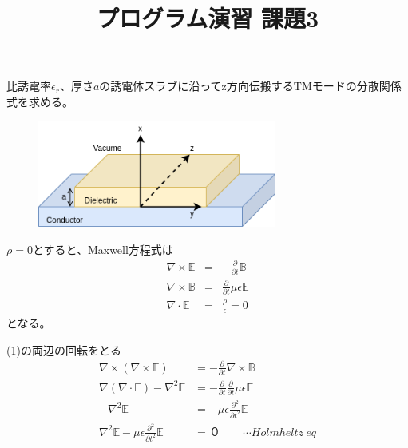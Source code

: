\documentclass[a4paper,10pt]{bxjsarticle}
\title{プログラム演習 課題3}
\date{ }
\begin{document}
\maketitle


比誘電率$\epsilon_r$、厚さ$a$の誘電体スラブに沿ってz方向伝搬するTMモードの分散関係式を求める。

\begin{figure}[h]
    \centering
    \includegraphics[width=0.7\textwidth]{fig.png}
    \caption{}
    \label{fig:1}
\end{figure}

$\rho = 0$とすると、Maxwell方程式は
\begin{eqnarray}
    \nabla \times \mathbb{E} &=& - \frac{\partial}{\partial t} \mathbb{B} \\
    \nabla \times \mathbb{B} &=&  \frac{\partial}{\partial t} \mu \epsilon \mathbb{E} \\
    \nabla \cdot \mathbb{E} &=& \frac{\rho}{\epsilon} = 0
\end{eqnarray}
となる。

(1)の両辺の回転をとる
\begin{align*}
    \nabla \times \left(\nabla \times \mathbb{E}\right)
        &= - \frac{\partial}{\partial t} \nabla \times \mathbb{B} \\
    \nabla \left(\nabla \cdot \mathbb{E}\right) - \nabla^2 \mathbb{E}
        &= - \frac{\partial}{\partial t} \frac{\partial}{\partial t} \mu \epsilon \mathbb{E} \\
    - \nabla^2 \mathbb{E}
        &= - \mu \epsilon \frac{\partial^2}{\partial t^2} \mathbb{E} \\
    \nabla^2 \mathbb{E} - \mu \epsilon \frac{\partial^2}{\partial t^2} \mathbb{E}
        &= ０ \qquad \cdots Holmheltz \ eq \\
\end{align*}
\end{document}

